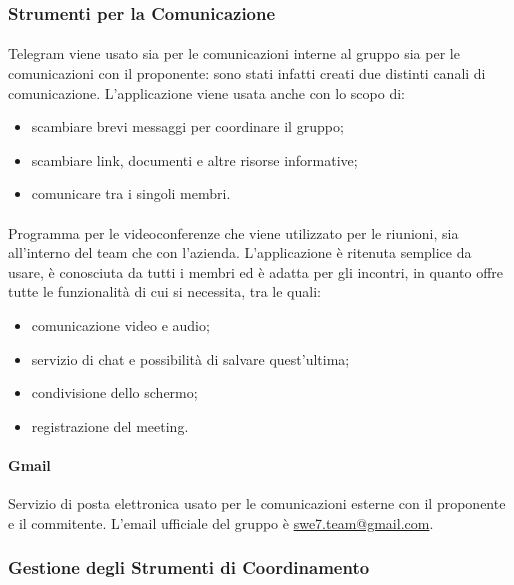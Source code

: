 \subsubsection{Strumenti per la Comunicazione}
\paragraph{} \hfill \break
Telegram viene usato sia per le comunicazioni interne al gruppo sia per le comunicazioni con il proponente:
sono stati infatti creati due distinti canali di comunicazione. L'applicazione viene usata anche con lo scopo 
di:
\begin{itemize}
    \item scambiare brevi messaggi per coordinare il gruppo;
    \item scambiare link, documenti e altre risorse informative;
    \item comunicare tra i singoli membri.
\end{itemize}

\paragraph{} \hfill \break
Programma per le videoconferenze che viene utilizzato per le riunioni, sia all'interno del team che con l'azienda. L'applicazione è ritenuta semplice da usare,
è conosciuta da tutti i membri ed è adatta per gli incontri, in quanto offre tutte le funzionalità di cui si necessita, tra le quali:
\begin{itemize}
    \item comunicazione video e audio;
    \item servizio di chat e possibilità di salvare quest'ultima;
    \item condivisione dello schermo;
    \item registrazione del meeting.
\end{itemize}

\paragraph{Gmail} \hfill \break
Servizio di posta elettronica usato per le comunicazioni esterne con il proponente e il commitente. L'email 
ufficiale del gruppo è \href{mailto:swe7.team@gmail.com}{swe7.team@gmail.com}.

\subsubsection{Gestione degli Strumenti di Coordinamento}

